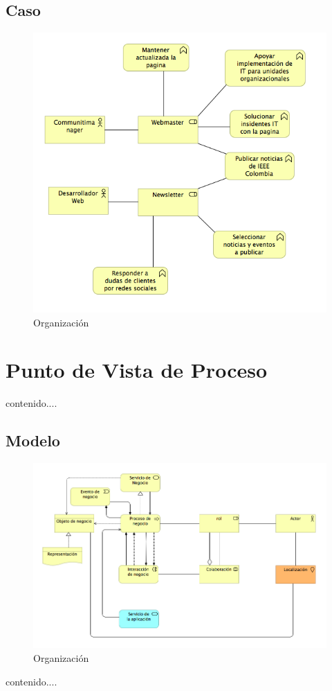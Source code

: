 \subsection{Caso}
\begin{figure}[th!]
	\centering
	\includegraphics[width=0.8\linewidth]{arquitectura_diseno/imgs/C_Funcion}
	\caption{Organización}
\end{figure}
\newpage
\section{Punto de Vista de Proceso}
contenido....
\subsection{Modelo}
\begin{figure}[th!]
	\centering
	\includegraphics[width=0.8\linewidth]{arquitectura_diseno/imgs/M_ProcesoNegocio}
	\caption{Organización}
\end{figure}
\newpage
contenido....

